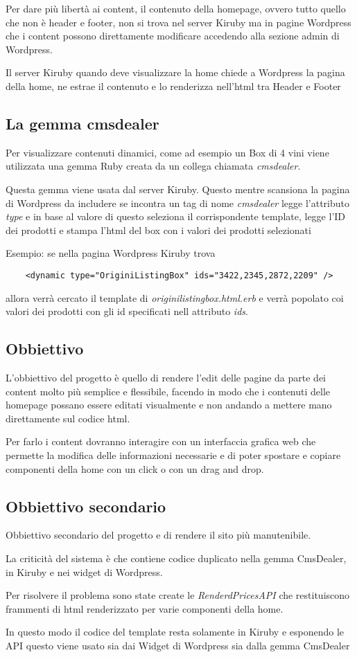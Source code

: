 Per dare più libertà ai content, il contenuto della homepage, ovvero tutto quello che non è
header e footer, non si trova nel server Kiruby ma in pagine Wordpress che i content possono direttamente 
modificare accedendo alla sezione admin di Wordpress.

Il server Kiruby quando deve visualizzare la home chiede a Wordpress la pagina della home, ne estrae
il contenuto e lo renderizza nell'html tra Header e Footer

\subsection{La gemma cmsdealer}
Per visualizzare contenuti dinamici, come ad esempio un Box di 4 vini viene utilizzata
una gemma Ruby creata da un collega chiamata \emph{cmsdealer}.

Questa gemma viene usata dal server Kiruby. Questo mentre scansiona la pagina di Wordpress da includere
se incontra un tag di nome \emph{cmsdealer} legge l'attributo \emph{type} e in base al valore di questo
seleziona il corrispondente template, legge l'ID dei prodotti e stampa l'html del box con
i valori dei prodotti selezionati

Esempio: se nella pagina Wordpress Kiruby trova
\begin{verbatim}
	<dynamic type="OriginiListingBox" ids="3422,2345,2872,2209" />
\end{verbatim}
allora verrà cercato il template di \emph{originilistingbox.html.erb} e verrà popolato
coi valori dei prodotti con gli id specificati nell attributo \emph{ids}.


\newpage
\subsection{Obbiettivo}
L'obbiettivo del progetto è quello di rendere l'edit delle pagine
da parte dei content molto più semplice e flessibile,
facendo in modo che i contenuti delle homepage possano essere editati visualmente e non
andando a mettere mano direttamente sul codice html.

Per farlo i content dovranno interagire con un interfaccia grafica web che permette
la modifica delle informazioni necessarie e di poter spostare e copiare
componenti della home con un click o con un drag and drop.

\subsection{Obbiettivo secondario}
Obbiettivo secondario del progetto e di rendere il sito più manutenibile.

La criticità del sistema è che contiene codice duplicato nella gemma CmsDealer, in Kiruby
e nei widget di Wordpress. 

Per risolvere il problema sono state create le  \emph{RenderdPricesAPI} 
che restituiscono frammenti di html renderizzato per varie componenti della home.

In questo modo il codice del template resta solamente in Kiruby e esponendo le 
API questo viene usato sia dai Widget di Wordpress sia dalla gemma CmsDealer

